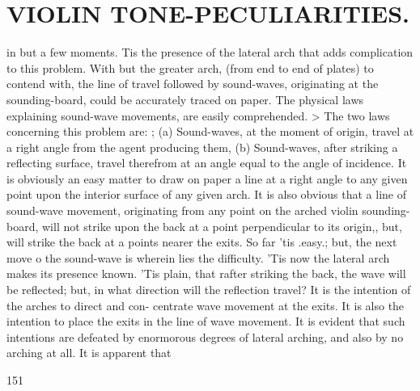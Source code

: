 \documentclass{article}
\begin{document}
\section*{VIOLIN TONE-PECULIARITIES.}
in but a few moments. Tis the presence of the lateral arch that adds complication to this problem. With but the greater arch, (from end to end of plates) to contend with, the line of travel followed by sound-waves, originating at the sounding-board, could be accurately traced on paper. The physical laws explaining sound-wave movements, are easily comprehended. > The two laws concerning this problem are: ; (a) Sound-waves, at the moment of origin, travel at a right angle from the agent producing them, (b) Sound-waves, after striking a reflecting surface, travel therefrom at an angle equal to the angle of incidence. It is obviously an easy matter to draw on paper a line at a right angle to any given point upon the interior surface of any given arch. It is also obvious that a line of sound-wave movement, originating from any point on the arched violin sounding-board, will not strike upon the back at a point perpendicular to its origin,, but, will strike the back at a points nearer the exits. So far 'tis .easy.; but, the next move o the sound-wave is wherein lies the difficulty. 'Tis now the lateral arch makes its presence known. 'Tis plain, that rafter striking the back, the wave will be reflected; but, in what direction will the reflection travel? It is the intention of the arches to direct and con- centrate wave movement at the exits. It is also the intention to place the exits in the line of wave movement. It is evident that such intentions are defeated by enormorous degrees of lateral arching, and also by no arching at all. It is apparent that

151
\end{document}
